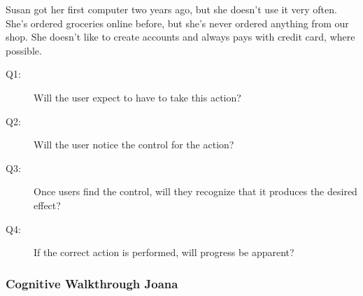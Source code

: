 Susan got her first computer two years ago, but she doesn't use it very often. She's ordered groceries online before, but she's never ordered anything from our shop.
She doesn't like to create accounts and always pays with credit card, where possible.

\begin{description}
\item[Q1:] Will the user expect to have to take this action?
\item[Q2:] Will the user notice the control for the action?
\item[Q3:] Once users find the control, will they recognize that it produces the desired effect?
\item[Q4:] If the correct action is performed, will progress be apparent?
\end{description}

\subsubsection{Cognitive Walkthrough Joana}
 
